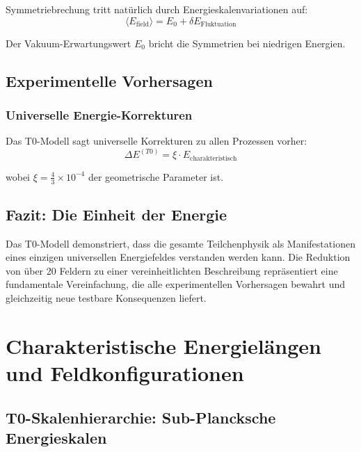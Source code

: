 \documentclass[12pt,a4paper]{report}
\begin{document}
	Symmetriebrechung tritt natürlich durch Energieskalenvariationen auf:
	\begin{equation}
		\langle E_{\text{field}} \rangle = E_0 + \delta E_{\text{Fluktuation}}
	\end{equation}
	
	Der Vakuum-Erwartungswert $E_0$ bricht die Symmetrien bei niedrigen Energien.
	
	\section{Experimentelle Vorhersagen}
	\label{sec:experimental_predictions}
	
	\subsection{Universelle Energie-Korrekturen}
	\label{subsec:universal_energy_corrections}
	
	Das T0-Modell sagt universelle Korrekturen zu allen Prozessen vorher:
	\begin{equation}
		\Delta E^{(T0)} = \xi \cdot E_{\text{charakteristisch}}
	\end{equation}
	
	wobei $\xi = \frac{4}{3} \times 10^{-4}$ der geometrische Parameter ist.
	

	
	\section{Fazit: Die Einheit der Energie}
	\label{sec:conclusion_unity}
	
	Das T0-Modell demonstriert, dass die gesamte Teilchenphysik als Manifestationen eines einzigen universellen Energiefeldes verstanden werden kann. Die Reduktion von über 20 Feldern zu einer vereinheitlichten Beschreibung repräsentiert eine fundamentale Vereinfachung, die alle experimentellen Vorhersagen bewahrt und gleichzeitig neue testbare Konsequenzen liefert.
	
	\chapter{Charakteristische Energielängen und Feldkonfigurationen}
	\label{chap:energy_lengths_configurations}
	
	\section{T0-Skalenhierarchie: Sub-Plancksche Energieskalen}
	\label{sec:scale_hierarchy}
	
\end{document}

